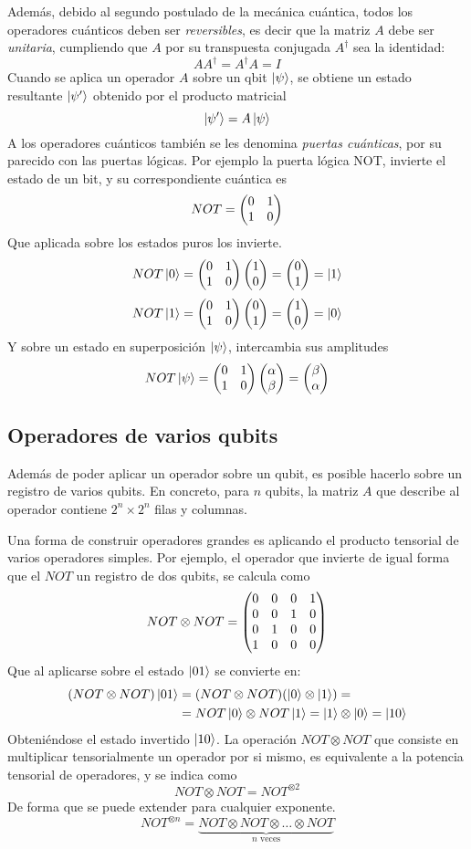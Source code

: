 Además, debido al segundo postulado de la mecánica cuántica, todos los 
operadores cuánticos deben ser \textit{reversibles}, es decir que la matriz $A$ 
debe ser \textit{unitaria}, cumpliendo que $A$ por su transpuesta conjugada 
$A^\dagger$ sea la identidad:
$$ A A^\dagger = A^\dagger A = I$$
%
Cuando se aplica un operador $A$ sobre un qbit $\ket{\psi}$, se obtiene un 
estado resultante $\ket{\psi'}$ obtenido por el producto matricial
$$ \ket{\psi'} = A\ket{\psi} $$
%
A los operadores cuánticos también se les denomina \textit{puertas cuánticas}, 
por su parecido con las puertas lógicas. Por ejemplo la puerta lógica NOT, 
invierte el estado de un bit, y su correspondiente cuántica es
%
$$ NOT = \begin{pmatrix} 0 & 1\\1 & 0 \end{pmatrix} $$
%
Que aplicada sobre los estados puros los invierte.
%
$$ NOT\ket{0} = \begin{pmatrix} 0 & 1\\1 & 0 \end{pmatrix} \begin{pmatrix} 1\\0 \end{pmatrix} = \begin{pmatrix} 0\\1 \end{pmatrix} = \ket{1} $$
$$ NOT\ket{1} = \begin{pmatrix} 0 & 1\\1 & 0 \end{pmatrix} \begin{pmatrix} 0\\1 \end{pmatrix} = \begin{pmatrix} 1\\0 \end{pmatrix} = \ket{0} $$
%
Y sobre un estado en superposición $\ket{\psi}$, intercambia sus amplitudes
%
$$ NOT\ket{\psi} = \begin{pmatrix} 0 & 1\\1 & 0 \end{pmatrix} \begin{pmatrix} \alpha \\ \beta \end{pmatrix} =
\begin{pmatrix} \beta\\\alpha \end{pmatrix} $$
%

\subsection{Operadores de varios qubits}

Además de poder aplicar un operador sobre un qubit, es posible hacerlo sobre un 
registro de varios qubits. En concreto, para $n$ qubits, la matriz $A$ que 
describe al operador contiene $2^n \times 2^n$ filas y columnas.

Una forma de construir operadores grandes es aplicando el producto tensorial de 
varios operadores simples. Por ejemplo, el operador que invierte de igual forma 
que el $NOT$ un registro de dos qubits, se calcula como
%
$$ NOT \otimes NOT = \begin{pmatrix} 0&0&0&1\\ 0&0&1&0 \\ 0&1&0&0 \\ 1&0&0&0 \end{pmatrix}$$
%
Que al aplicarse sobre el estado $\ket{01}$ se convierte en:
%
\begin{equation*}
\begin{split}
(NOT \otimes NOT) \ket{01} &= (NOT \otimes NOT) (\ket{0} \otimes \ket{1}) =\\
& = NOT \ket{0} \otimes NOT \ket{1} = \ket{1} \otimes \ket{0} = \ket{10}
\end{split}
\end{equation*}
%
Obteniéndose el estado invertido $\ket{10}$. La operación $NOT \otimes NOT$ que 
consiste en multiplicar tensorialmente un operador por si mismo, es equivalente 
a la potencia tensorial de operadores, y se indica como
%
$$ NOT \otimes NOT = NOT^{\otimes 2} $$
%
De forma que se puede extender para cualquier exponente.
%
$$ NOT^{\otimes n} = \underbrace{NOT\otimes NOT\otimes \ldots \otimes NOT}_{n 
\text{ veces}}$$
%

